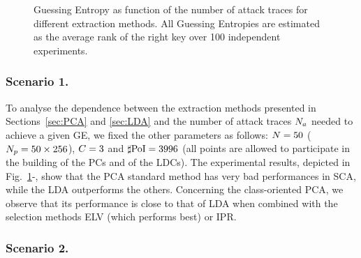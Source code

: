 \begin{figure}[t]
\caption[Guessing Entropy as function of the number of attack traces]{Guessing Entropy as function of the number of attack traces for different extraction methods. All Guessing Entropies are estimated as the average rank of the right key over 100 independent experiments.}\label{fig:scenario1}
\end{figure}
\subsubsection{Scenario 1.}
To analyse the dependence between the extraction methods presented in Sections~\ref{sec:PCA} and \ref{sec:LDA} and the number of attack traces $N_a$ needed to achieve a given GE, we fixed the other parameters as follows: $N=50$ ($N_p=50\times 256$), $C = 3$ and $\sharp\mathrm{PoI} = 3996$ (all points are allowed to participate in the building of the PCs and of the LDCs). The experimental results, depicted in Fig.~\ref{fig:scenario1}-, show that the PCA standard method has very bad performances in SCA, while the LDA outperforms the others. Concerning the class-oriented PCA, we observe that its performance is close to that of LDA when combined with the selection methods ELV (which performs best) or IPR.  



\subsubsection{Scenario 2.}


